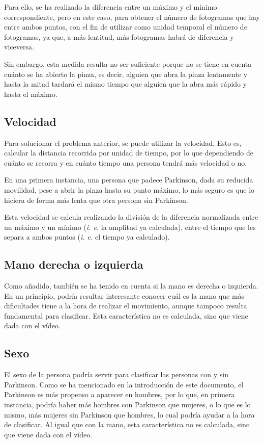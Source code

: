 Para ello, se ha realizado la diferencia entre un máximo y el mínimo correspondiente, pero en este caso, para obtener el número de fotogramas que hay entre ambos puntos, con el fin de utilizar como unidad temporal el número de fotogramas, ya que, a más lentitud, más fotogramas habrá de diferencia y viceversa.

Sin embargo, esta medida resulta no ser suficiente porque no se tiene en cuenta cuánto se ha abierto la pinza, es decir, alguien que abra la pinza lentamente y hasta la mitad tardará el mismo tiempo que alguien que la abra más rápido y hasta el máximo.

\subsection{Velocidad}
Para solucionar el problema anterior, se puede utilizar la velocidad. Esto es, calcular la distancia recorrida por unidad de tiempo, por lo que dependiendo de cuánto se recorra y en cuánto tiempo una persona tendrá más velocidad o no.

En una primera instancia, una persona que padece Parkinson, dada su reducida movilidad, pese a abrir la pinza hasta su punto máximo, lo más seguro es que lo hiciera de forma más lenta que otra persona sin Parkinson.

Esta velocidad se calcula realizando la división de la diferencia normalizada entre un máximo y un mínimo (\textit{i. e.} la amplitud ya calculada), entre el tiempo que les separa a ambos puntos (\textit{i. e.} el tiempo ya calculado).

\subsection{Mano derecha o izquierda}
Como añadido, también se ha tenido en cuenta si la mano es derecha o izquierda. En un principio, podría resultar interesante conocer cuál es la mano que más dificultades tiene a la hora de realizar el movimiento, aunque tampoco resulta fundamental para clasificar. Esta característica no es calculada, sino que viene dada con el vídeo.

\subsection{Sexo}
El sexo de la persona podría servir para clasificar las personas con y sin Parkinson. Como se ha mencionado en la introducción de este documento, el Parkinson es más propenso a aparecer en hombres, por lo que, en primera instancia, podría haber más hombres con Parkinson que mujeres, o lo que es lo mismo, más mujeres sin Parkinson que hombres, lo cual podría ayudar a la hora de clasificar. Al igual que con la mano, esta característica no es calculada, sino que viene dada con el vídeo.

